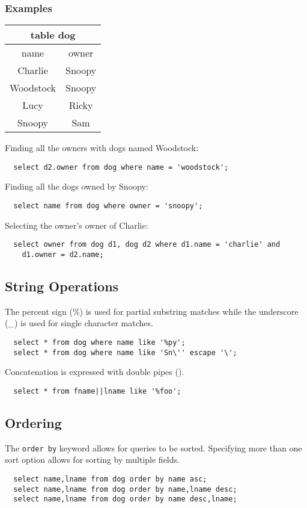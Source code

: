 \documentclass{math}
\begin{document}
\subsubsection*{Examples}
\begin{center}
  \begin{tabular}{|c|c|}
    \hline
    \multicolumn{2}{|c|}{table dog} \\
    \hline
    name & owner \\
    \hline
    Charlie & Snoopy \\
    Woodstock & Snoopy \\
    Lucy & Ricky \\
    Snoopy & Sam \\
    \hline
  \end{tabular}
\end{center}
Finding all the owners with dogs named Woodstock:
\begin{lstlisting}
  select d2.owner from dog where name = 'woodstock';
\end{lstlisting}
Finding all the dogs owned by Snoopy:
\begin{lstlisting}
  select name from dog where owner = 'snoopy';
\end{lstlisting}
Selecting the owner's owner of Charlie:
\begin{lstlisting}
  select owner from dog d1, dog d2 where d1.name = 'charlie' and
    d1.owner = d2.name;
\end{lstlisting}

\subsection*{String Operations}
The percent sign (\%) is used for partial substring matches while the
underscore (\_) is used for single character matches.
\begin{lstlisting}
  select * from dog where name like '%py';
  select * from dog where name like 'Sn\'' escape '\';
\end{lstlisting}
Concatenation is expressed with double pipes (\textbar\textbar).
\begin{lstlisting}
  select * from fname||lname like '%foo';
\end{lstlisting}

\subsection*{Ordering}
The \texttt{order by} keyword allows for queries to be sorted. Specifying more
than one sort option allows for sorting by multiple fields.
\begin{lstlisting}
  select name,lname from dog order by name asc;
  select name,lname from dog order by name,lname desc;
  select name,lname from dog order by name desc,lname;
\end{lstlisting}
\end{document}
